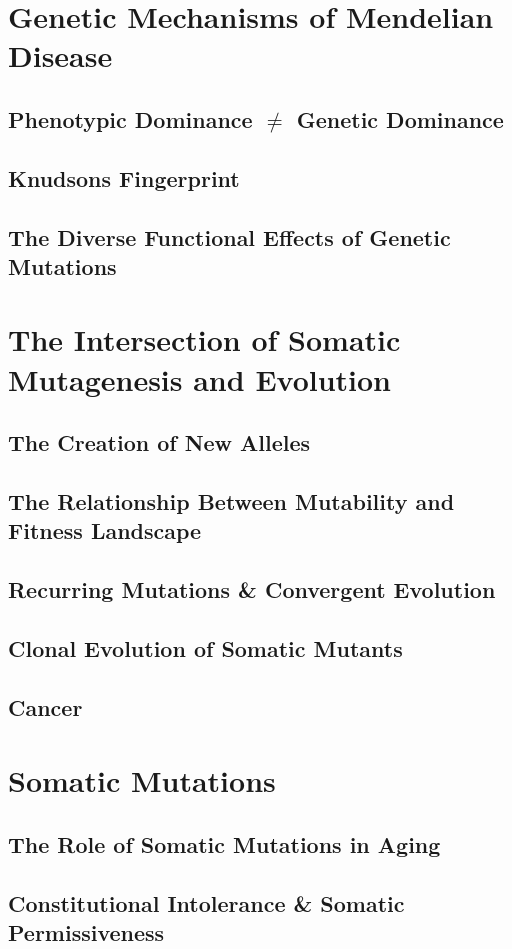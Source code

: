 \section{Genetic Mechanisms of Mendelian Disease}
\subsection{Phenotypic Dominance $\neq$ Genetic Dominance}
\subsection{Knudsons Fingerprint}
\subsection{The Diverse Functional Effects of Genetic Mutations}

\section{The Intersection of Somatic Mutagenesis and Evolution}
\subsection{The Creation of New Alleles}
\subsection{The Relationship Between Mutability and Fitness Landscape}
\subsection{Recurring Mutations \& Convergent Evolution}
\subsection{Clonal Evolution of Somatic Mutants}
\subsection{Cancer}

\section{Somatic Mutations}
\subsection{The Role of Somatic Mutations in Aging}
\subsection{Constitutional Intolerance \& Somatic Permissiveness}
